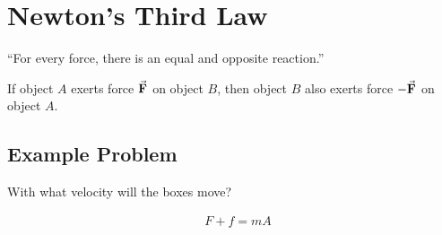 \documentclass[12pt]{article}
\begin{document}
\section{Newton's Third Law}
``For every force, there is an equal and opposite reaction.''
\bigskip

\noindent If object $A$ exerts force $\va{F}$ on object $B$, then 
object $B$ also exerts force $-\va{F}$ on object $A$.

\newpage
\subsection{Example Problem}
With what velocity will the boxes move?
\begin{figure}[h]
    \centering
\end{figure}
\begin{align}
    &F + f = mA
\end{align}
\end{document}
